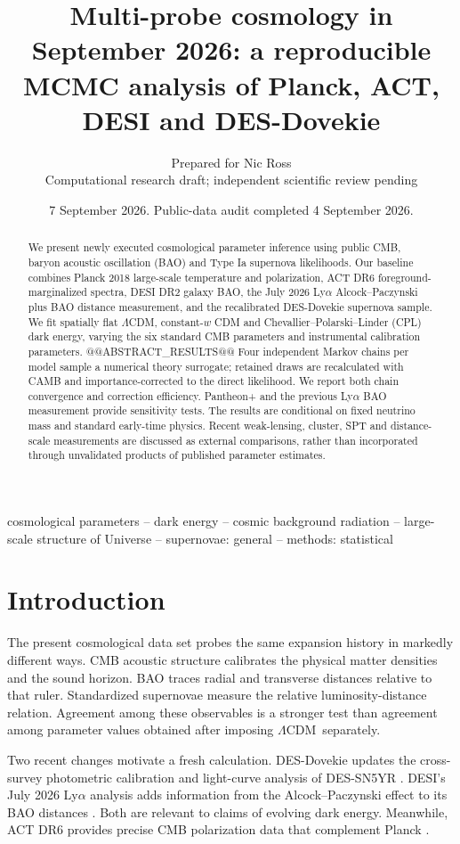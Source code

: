 \documentclass[fleqn,usenatbib]{mnras}
\title[Multi-probe cosmology in September 2026]{Multi-probe cosmology in September 2026: a reproducible MCMC analysis of Planck, ACT, DESI and DES-Dovekie}
\author[Research draft]{Prepared for Nic Ross\\
\small Computational research draft; independent scientific review pending}
\date{7 September 2026. Public-data audit completed 4 September 2026.}
\newcommand{\lcdm}{$\Lambda$CDM}
\begin{document}
\pagestyle{headings}
\label{firstpage}
\pagerange{\pageref{firstpage}--\pageref{lastpage}}
\maketitle
\begin{abstract}
We present newly executed cosmological parameter inference using public CMB,
baryon acoustic oscillation (BAO) and Type Ia supernova likelihoods. Our baseline
combines Planck 2018 large-scale temperature and polarization, ACT DR6
foreground-marginalized spectra, DESI DR2 galaxy BAO, the July 2026 Ly$\alpha$
Alcock--Paczynski plus BAO distance measurement, and the recalibrated
DES-Dovekie supernova sample. We fit spatially flat \lcdm, constant-$w$ CDM and
Chevallier--Polarski--Linder (CPL) dark energy, varying the six standard CMB
parameters and instrumental calibration parameters. @@ABSTRACT_RESULTS@@
Four independent Markov chains per model sample a numerical theory surrogate;
retained draws are recalculated with CAMB and importance-corrected to the direct
likelihood. We report both chain convergence and correction efficiency.
Pantheon+ and the previous Ly$\alpha$ BAO measurement provide sensitivity tests.
The results are conditional on fixed neutrino mass and standard early-time
physics. Recent weak-lensing, cluster, SPT and distance-scale measurements are
discussed as external comparisons, rather than incorporated through unvalidated
products of published parameter estimates.
\end{abstract}
\begin{keywords}
cosmological parameters -- dark energy -- cosmic background radiation --
large-scale structure of Universe -- supernovae: general -- methods: statistical
\end{keywords}

\section{Introduction}
The present cosmological data set probes the same expansion history in markedly
different ways. CMB acoustic structure calibrates the physical matter densities
and the sound horizon. BAO traces radial and transverse distances relative to
that ruler. Standardized supernovae measure the relative luminosity-distance
relation. Agreement among these observables is a stronger test than agreement
among parameter values obtained after imposing \lcdm\ separately.

Two recent changes motivate a fresh calculation. DES-Dovekie updates the
cross-survey photometric calibration and light-curve analysis of DES-SN5YR
\citep{Dovekie}. DESI's July 2026 Ly$\alpha$ analysis adds information from the
Alcock--Paczynski effect to its BAO distances \citep{DESI2026}. Both are relevant
to claims of evolving dark energy. Meanwhile, ACT DR6 provides precise CMB
polarization data that complement Planck \citep{ACT2025,ACTextended}.
\end{document}
